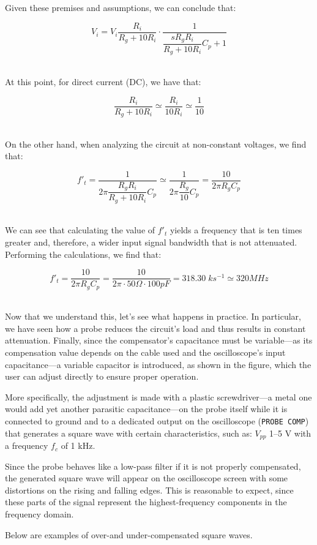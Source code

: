 \documentclass[../main.tex]{subfiles}
\begin{document}
Given these premises and assumptions, we can conclude that:

\[ V_i = V_i \dfrac{R_i}{R_g + 10R_i}  \cdot \dfrac{1}{\dfrac{s R_gR_i}{R_g + 10R_i}C_p + 1} \]\

At this point, for direct current (DC), we have that:

\[ \dfrac{R_i}{R_g + 10R_i}  \simeq \dfrac{R_i}{10R_i} \simeq \frac{1}{10} \]\

On the other hand, when analyzing the circuit at non-constant voltages, we find that:

\[ f'_t = \frac{1}{2\pi \dfrac{R_gR_i}{R_g + 10R_i}C_p } \simeq \frac{1}{2\pi \dfrac{R_g}{10}C_p }  = \frac{10}{2\pi R_g C_p} \]\

We can see that calculating the value of $f'_t$ yields a frequency that is ten times greater and, therefore, a wider input signal bandwidth that is not attenuated.
Performing the calculations, we find that:


\[ f'_t = \frac{10}{2\pi R_g C_p} = \frac{10}{2\pi \cdot 50 \Omega \cdot 100 \unit{pF}} = 318.30\; \unit{ks^{-1}} \simeq 320 \unit{MHz} \]\

Now that we understand this, let’s see what happens in practice. 
In particular, we have seen how a probe reduces the circuit’s load and thus results in constant attenuation. Finally, since the compensator’s capacitance must be variable—as its compensation value depends on the cable used and the oscilloscope’s input capacitance—a variable capacitor is introduced, as shown in the figure, which the user can adjust directly to ensure proper operation.

More specifically, the adjustment is made with a plastic screwdriver—a metal one would add yet another parasitic capacitance—on the probe itself while it is connected to ground and to a dedicated output on the oscilloscope (\texttt{PROBE COMP}) that generates a square wave with certain characteristics, such as: $V_{pp}$ 1–5 V with a frequency $f_c$ of 1 kHz.

Since the probe behaves like a low-pass filter if it is not properly compensated, the generated square wave will appear on the oscilloscope screen with some distortions on the rising and falling edges. This is reasonable to expect, since these parts of the signal represent the highest-frequency components in the frequency domain. 

Below are examples of over-and under-compensated square waves.
\end{document}
